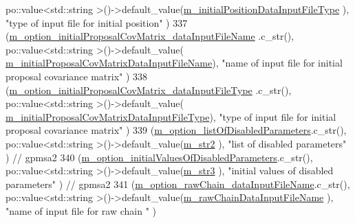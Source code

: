 \begin{DoxyCode}
       po::value<std::string >()->default\_value(\hyperlink{class_q_u_e_s_o_1_1_m_l_sampling_level_options_a582573c99a718b1eefe417c0cccf071f}{m\_initialPositionDataInputFileType}
               ), \textcolor{stringliteral}{"type of input file for initial position"}                         )
337     (\hyperlink{class_q_u_e_s_o_1_1_m_l_sampling_level_options_ada1645363cc30723d66b6c8237425ec3}{m\_option\_initialProposalCovMatrix\_dataInputFileName}
      .c\_str(), po::value<std::string >()->default\_value(
      \hyperlink{class_q_u_e_s_o_1_1_m_l_sampling_level_options_aa2dd58cb7865577da082fde9f0b180cb}{m\_initialProposalCovMatrixDataInputFileName}), \textcolor{stringliteral}{"name of input
       file for initial proposal covariance matrix"}       )
338     (\hyperlink{class_q_u_e_s_o_1_1_m_l_sampling_level_options_a75a15f2c496d82ce310669fb9de753c5}{m\_option\_initialProposalCovMatrix\_dataInputFileType}
      .c\_str(), po::value<std::string >()->default\_value(
      \hyperlink{class_q_u_e_s_o_1_1_m_l_sampling_level_options_a6e6ea2f36afd7b6a6900eaf44165a796}{m\_initialProposalCovMatrixDataInputFileType}), \textcolor{stringliteral}{"type of input
       file for initial proposal covariance matrix"}       )
339     (\hyperlink{class_q_u_e_s_o_1_1_m_l_sampling_level_options_a296043cd6f00282ccf1a39e219aa16ef}{m\_option\_listOfDisabledParameters}.c\_str(),                   
      po::value<std::string >()->default\_value(\hyperlink{class_q_u_e_s_o_1_1_m_l_sampling_level_options_ab91c7af5bfcfeb0466970713e2655e3a}{m\_str2}                                     ), \textcolor{stringliteral}{"list of disabled
       parameters"}                                     ) \textcolor{comment}{// gpmsa2}
340     (\hyperlink{class_q_u_e_s_o_1_1_m_l_sampling_level_options_ab96236f77ecc1033bcdecbddced0c60f}{m\_option\_initialValuesOfDisabledParameters}.c\_str(),         
       po::value<std::string >()->default\_value(\hyperlink{class_q_u_e_s_o_1_1_m_l_sampling_level_options_ab373068cdb371c781603dbb2b75ae14d}{m\_str3}                                     ), \textcolor{stringliteral}{"initial
       values of disabled parameters"}                           ) \textcolor{comment}{// gpmsa2}
341     (\hyperlink{class_q_u_e_s_o_1_1_m_l_sampling_level_options_a58eff69f727ad1128029a0d6fc98e556}{m\_option\_rawChain\_dataInputFileName}.c\_str(),                 
      po::value<std::string >()->default\_value(\hyperlink{class_q_u_e_s_o_1_1_m_l_sampling_level_options_a192498743c73fa9244c8652530beebb2}{m\_rawChainDataInputFileName}                ), \textcolor{stringliteral}{
      "name of input file for raw chain "}                               )

\end{DoxyCode}
